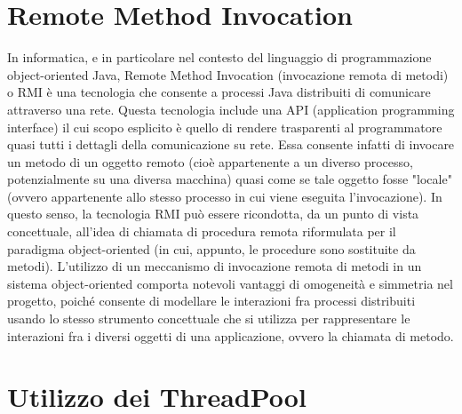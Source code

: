 \section{Remote Method Invocation}
In informatica, e in particolare nel contesto del linguaggio di programmazione object-oriented Java, Remote Method Invocation (invocazione remota di metodi) o RMI è una tecnologia che consente a processi Java distribuiti di comunicare attraverso una rete. Questa tecnologia include una API (application programming interface) il cui scopo esplicito è quello di rendere trasparenti al programmatore quasi tutti i dettagli della comunicazione su rete. Essa consente infatti di invocare un metodo di un oggetto remoto (cioè appartenente a un diverso processo, potenzialmente su una diversa macchina) quasi come se tale oggetto fosse "locale" (ovvero appartenente allo stesso processo in cui viene eseguita l'invocazione). In questo senso, la tecnologia RMI può essere ricondotta, da un punto di vista concettuale, all'idea di chiamata di procedura remota riformulata per il paradigma object-oriented (in cui, appunto, le procedure sono sostituite da metodi).
L'utilizzo di un meccanismo di invocazione remota di metodi in un sistema object-oriented comporta notevoli vantaggi di omogeneità e simmetria nel progetto, poiché consente di modellare le interazioni fra processi distribuiti usando lo stesso strumento concettuale che si utilizza per rappresentare le interazioni fra i diversi oggetti di una applicazione, ovvero la chiamata di metodo. 

\section{Utilizzo dei ThreadPool}\label{sec:thread_pool}